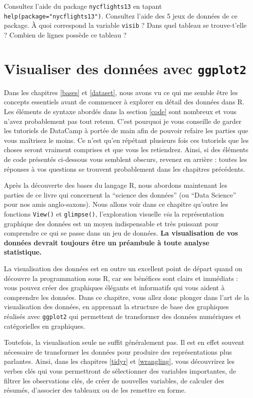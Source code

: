 \documentclass[a4paperpaper,]{article}
\theoremstyle{definition}
\theoremstyle{definition}
\theoremstyle{definition}
\theoremstyle{remark}
\begin{document}
Consultez l'aide du package \texttt{nycflights13} en tapant
\texttt{help(package="nycflights13")}. Consultez l'aide des 5 jeux de
données de ce package. À quoi correspond la variable \texttt{visib} ?
Dans quel tableau se trouve-t'elle ? Combien de lignes possède ce
tableau ?

\hypertarget{viz}{%
\section{\texorpdfstring{Visualiser des données avec
\texttt{ggplot2}}{Visualiser des données avec ggplot2}}\label{viz}}

Dans les chapitres \ref{bases} et \ref{dataset}, nous avons vu ce qui me
semble être les concepts essentiels avant de commencer à explorer en
détail des données dans R. Les éléments de syntaxe abordés dans la
section \ref{code} sont nombreux et vous n'avez probablement pas tout
retenu. C'est pourquoi je vous conseille de garder les tutoriels de
DataCamp à portée de main afin de pouvoir refaire les parties que vous
maîtrisez le moins. Ce n'est qu'en répétant plusieurs fois ces tutoriels
que les choses seront vraiment comprises et que vous les retiendrez.
Ainsi, si des éléments de code présentés ci-dessous vous semblent
obscurs, revenez en arrière : toutes les réponses à vos questions se
trouvent probablement dans les chapitres précédents.

Après la découverte des bases du langage R, nous abordons maintenant les
parties de ce livre qui concernent la ``science des données'' (ou ``Data
Science'' pour nos amis anglo-saxons). Nous allons voir dans ce chapitre
qu'outre les fonctions \texttt{View()} et \texttt{glimpse()},
l'exploration visuelle \emph{via} la représentation graphique des
données est un moyen indispensable et très puissant pour comprendre ce
qui se passe dans un jeu de données. \textbf{La visualisation de vos
données devrait toujours être un préambule à toute analyse statistique.}

La visualisation des données est en outre un excellent point de départ
quand on découvre la programmation sous R, car ses bénéfices sont clairs
et immédiats : vous pouvez créer des graphiques élégants et informatifs
qui vous aident à comprendre les données. Dans ce chapitre, vous allez
donc plonger dans l'art de la visualisation des données, en apprenant la
structure de base des graphiques réalisés avec \texttt{ggplot2} qui
permettent de transformer des données numériques et catégorielles en
graphiques.

Toutefois, la visualisation seule ne suffit généralement pas. Il est en
effet souvent nécessaire de transformer les données pour produire des
représentations plus parlantes. Ainsi, dans les chapitres \ref{tidyr} et
\ref{wrangling}, vous découvrirez les verbes clés qui vous permettront
de sélectionner des variables importantes, de filtrer les observations
clés, de créer de nouvelles variables, de calculer des résumés,
d'associer des tableaux ou de les remettre en forme.
\end{document}
